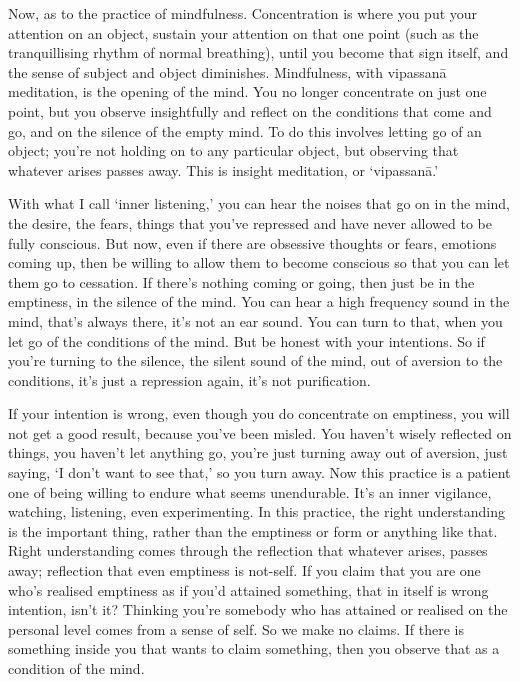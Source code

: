 
Now, as to the practice of mindfulness. Concentration is where you put your attention on an object, sustain your attention on that one point (such as the tranquillising rhythm of normal breathing), until you become that sign itself, and the sense of subject and object diminishes. Mindfulness, with vipassanā meditation, is the opening of the mind. You no longer concentrate on just one point, but you observe insightfully and reflect on the conditions that come and go, and on the silence of the empty mind. To do this involves letting go of an object; you're not holding on to any particular object, but observing that whatever arises passes away. This is insight meditation, or `vipassanā.'

With what I call `inner listening,' you can hear the noises that go on in the mind, the desire, the fears, things that you've repressed and have never allowed to be fully conscious. But now, even if there are obsessive thoughts or fears, emotions coming up, then be willing to allow them to become conscious so that you can let them go to cessation. If there's nothing coming or going, then just be in the emptiness, in the silence of the mind. You can hear a high frequency sound in the mind, that's always there, it's not an ear sound. You can turn to that, when you let go of the conditions of the mind. But be honest with your intentions. So if you're turning to the silence, the silent sound of the mind, out of aversion to the conditions, it's just a repression again, it's not purification.

If your intention is wrong, even though you do concentrate on emptiness, you will not get a good result, because you've been misled. You haven't wisely reflected on things, you haven't let anything go, you're just turning away out of aversion, just saying, `I don't want to see that,' so you turn away. Now this practice is a patient one of being willing to endure what seems unendurable. It's an inner vigilance, watching, listening, even experimenting. In this practice, the right understanding is the important thing, rather than the emptiness or form or anything like that. Right understanding comes through the reflection that whatever arises, passes away; reflection that even emptiness is not-self. If you claim that you are one who's realised emptiness as if you'd attained something, that in itself is wrong intention, isn't it? Thinking you're somebody who has attained or realised on the personal level comes from a sense of self. So we make no claims. If there is something inside you that wants to claim something, then you observe that as a condition of the mind.

